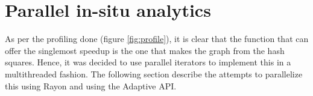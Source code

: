 
\chapter{Parallel in-situ analytics} %

\label{Chapter7} %


As per the profiling done (figure \ref{fig:profile}), it is clear that the function that can offer the singlemost speedup is the one that makes the graph from the hash squares. Hence, it was decided to use parallel iterators to implement this in a multithreaded fashion. The following section describe the attempts to parallelize this using Rayon and using the Adaptive API.

